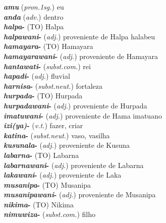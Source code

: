 
\begin{multicols}{2}
	\begin{hangparas}{1em}{1}
		\raggedright%
		\textbf{\emph{amu}} (\emph{pron.1sg.}) \tabto{1em} eu\\
		\textbf{\emph{anda}} (\emph{adv.}) \tabto{1em} dentro\\
		\textbf{\emph{halpa}-} (TO) \tabto{1em} Halpa\\
		\textbf{\emph{halpawani}-} (\emph{adj.}) \tabto{1em} proveniente de Halpa \tabto{1em} halabeu\\
		\textbf{\emph{hamayara}-} (TO) \tabto{1em} Hamayara\\
		\textbf{\emph{hamayarawani}-} (\emph{adj.}) \tabto{1em} proveniente de Hamayara\\
		\textbf{\emph{hantawati}-} (\emph{subst.com.}) \tabto{1em} rei\\
		\textbf{\emph{hapadi}-} (\emph{adj.}) \tabto{1em} fluvial\\
		\textbf{\emph{harnisa}-} (\emph{subst.neut.}) \tabto{1em} fortaleza\\
		\textbf{\emph{hurpada}-} (TO) \tabto{1em} Hurpada\\
		\textbf{\emph{hurpadawani}-} (\emph{adj.}) \tabto{1em} proveniente de Hurpada\\
		\textbf{\emph{imatuwani}-} (\emph{adj.}) \tabto{1em} proveniente de Hama
		\tabto{1em} imatuano\\
		\textbf{\emph{izi{(ya)}}-} (\emph{v.t.}) \tabto{1em} fazer, criar\\
		\textbf{\emph{katina}-} (\emph{subst.neut.}) \tabto{1em} vaso, vasilha\\
		\textbf{\emph{kusunala}-} (\emph{adj.}) \tabto{1em} proveniente de Kusuna\\
		\textbf{\emph{labarna}-} (TO) \tabto{1em} Labarna \\
		\textbf{\emph{labarnawani}-} (\emph{adj.}) \tabto{1em} proveniente de Labarna\\
		\textbf{\emph{lakawani}-} (\emph{adj.}) \tabto{1em} proveniente de Laka\\
		\textbf{\emph{musanipa}-} (TO) \tabto{1em} Musanipa\\
		\textbf{\emph{musanipawani}-} (\emph{adj.}) \tabto{1em} proveniente de Musanipa\\
		\textbf{\emph{nikima}-} (TO) \tabto{1em} Nikima\\
		\textbf{\emph{nimuwiza}-} (\emph{subst.com.}) \tabto{1em} filho\\

\end{hangparas}
\end{multicols}
